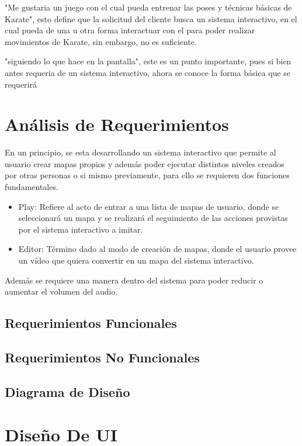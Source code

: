 "Me gustaria un juego con el cual pueda entrenar las poses y técnicas básicas de Karate", esto define que la solicitud del cliente busca un sistema interactivo, en el cual pueda de una u otra forma interactuar con el para poder realizar movimientos de Karate, sin embargo, no es suficiente. 

"siguiendo lo que hace en la pantalla", este es un punto importante, pues si bien antes requeria de un sistema interactivo, ahora se conoce la forma básica que se requerirá



\section{Análisis de Requerimientos}

En un principio, se esta desarrollando un sistema interactivo que permite al usuario crear mapas propios y además poder ejecutar distintos niveles creados por otras personas o si mismo previamente, para ello se requieren dos funciones fundamentales.

\begin{itemize}
	\item Play: Refiere al acto de entrar a una lista de mapas de usuario, donde se seleccionará un mapa y se realizará el seguimiento de las acciones provistas por el sistema interactivo a imitar.	
	\item Editor: Término dado al modo de creación de mapas, donde el usuario provee un vídeo que quiera convertir en un mapa del sistema interactivo.
\end{itemize}

Además se requiere una manera dentro del sistema para poder reducir o aumentar el volumen del audio.



\subsection{Requerimientos Funcionales}


\subsection{Requerimientos No Funcionales}


\subsection{Diagrama de Diseño}

\section{Diseño De UI}

\section{}
